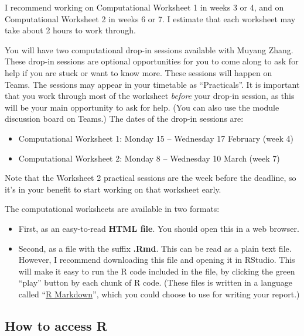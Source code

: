 \documentclass[
  a4paper,
]{article}
\providecommand{\tightlist}{%
  \setlength{\itemsep}{0pt}\setlength{\parskip}{0pt}}
\theoremstyle{definition}
\theoremstyle{definition}
\theoremstyle{definition}
\theoremstyle{remark}
\begin{document}
I recommend working on Computational Worksheet 1 in weeks 3 or 4, and on Computational Worksheet 2 in weeks 6 or 7. I estimate that each worksheet may take about 2 hours to work through.

You will have two computational drop-in sessions available with Muyang Zhang. These drop-in sessions are optional opportunities for you to come along to ask for help if you are stuck or want to know more. These sessions will happen on Teams. The sessions may appear in your timetable as ``Practicals''. It is important that you work through most of the worksheet \emph{before} your drop-in session, as this will be your main opportunity to ask for help. (You can also use the module discussion board on Teams.) The dates of the drop-in sessions are:

\begin{itemize}
\tightlist
\item
  Computational Worksheet 1: Monday 15 -- Wednesday 17 February (week 4)
\item
  Computational Worksheet 2: Monday 8 -- Wednesday 10 March (week 7)
\end{itemize}

Note that the Worksheet 2 practical sessions are the week before the deadline, so it's in your benefit to start working on that worksheet early.

The computational worksheets are available in two formats:

\begin{itemize}
\tightlist
\item
  First, as an easy-to-read \textbf{HTML file}. You should open this in a web browser.
\item
  Second, as a file with the suffix \textbf{.Rmd}. This can be read as a plain text file. However, I recommend downloading this file and opening it in RStudio. This will make it easy to run the R code included in the file, by clicking the green ``play'' button by each chunk of R code. (These files is written in a language called ``\href{https://www.stat.cmu.edu/~cshalizi/rmarkdown/}{R Markdown}'', which you could choose to use for writing your report.)
\end{itemize}

\hypertarget{R-access}{%
\subsection*{How to access R}\label{R-access}}
\end{document}
